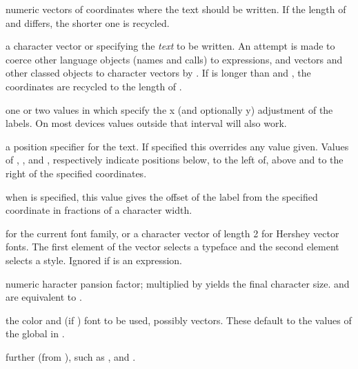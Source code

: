 %
\begin{Arguments}
\begin{ldescription}
\item[\code{x, y}] numeric vectors of coordinates where the text
 should be written.  If the length of  and
 differs, the shorter one is recycled.
\item[\code{labels}] a character vector or  specifying
the \emph{text} to be written.  An attempt is made to coerce other
language objects (names and calls) to expressions, and vectors and
other classed objects to character vectors by .
If  is longer than  and
, the coordinates are recycled to the length of .
\item[\code{adj}] one or two values in \eqn{[0, 1]}{} which specify the x
(and optionally y) adjustment of the labels.  On most devices values
outside that interval will also work.
\item[\code{pos}] a position specifier for the text.  If specified this
overrides any  value given.  Values of ,
,  and , respectively indicate
positions below, to the left of, above and to the right of
the specified coordinates.
\item[\code{offset}] when  is specified, this value gives the
offset of the label from the specified coordinate in fractions
of a character width.
\item[\code{vfont}]  for the current font family, or a character
vector of length 2 for Hershey vector fonts.  The first element of
the vector selects a typeface and the second element selects a
style.  Ignored if  is an expression.
\item[\code{cex}] numeric haracter pansion factor; multiplied
by  yields the final character size.
 and  are equivalent to .
\item[\code{col, font}] the color and (if ) font to be
used, possibly vectors.  These default to the values of the global
 in .
\item[\code{...}] further  (from ),
such as ,  and .
\end{ldescription}
\end{Arguments}
